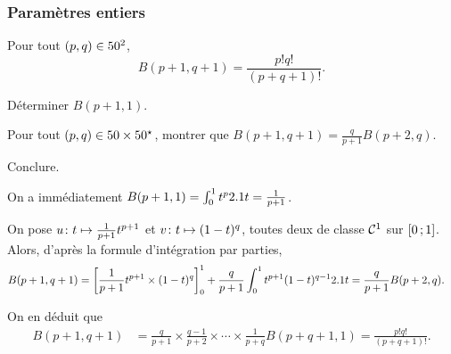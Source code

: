 \begin{comment}
\begin{defi}[Fonction bêta]
Pour tout $(p,q) \in \N^2$, on note
$$B(p, q) \defeq \int_{0}^{1} t^p (1-t)^q \d t.$$
\end{defi}
\end{comment}

\subsubsection{Paramètres entiers}

\begin{theo}
Pour tout $(p,q) \in \N^2$,
    $$B(p+1, q+1) = \frac{p! q!}{(p + q + 1)!}.$$
\end{theo}


\begin{exercice}
\begin{questions}
\item Déterminer $B(p+1, 1)$.

\item Pour tout $(p, q) \in \N \times \Ne$, montrer que $B(p+1, q+1) = \frac{q}{p + 1} B(p+2, q)$.

\item Conclure.
\end{questions}
\end{exercice}

\begin{solution}
\begin{reponses}
\item On a immédiatement $B(p+1, 1) = \int_0^1 t^p \d t = \frac{1}{p + 1}$.

\item On pose $\fonctionligne[u]{t}{\frac{1}{p+1} t^{p+1}}$ et $\fonctionligne[v]{t}{(1-t)^q}$, toutes deux de classe $\Cont^1$ sur $\interff{0}{1}$. Alors, d'après la formule d'intégration par parties, 
\begin{align*}
B(p+1, q+1)
&= \left[ \frac{1}{p+1}t^{p+1} \times (1-t)^q \right]_0^1 + \frac{q}{p+1} \int_0^1 t^{p+1} (1-t)^{q-1} \d t
= \frac{q}{p+1} B(p+2, q).
\end{align*}

On en déduit que 
\begin{align*}
B(p+1, q+1)
&= \frac{q}{p+1} \times \frac{q-1}{p+2} \times \cdots \times \frac{1}{p+q} B(p+q+1, 1)
= \frac{p! q!}{(p + q + 1)!}.
\end{align*}
\end{reponses}
\end{solution}

